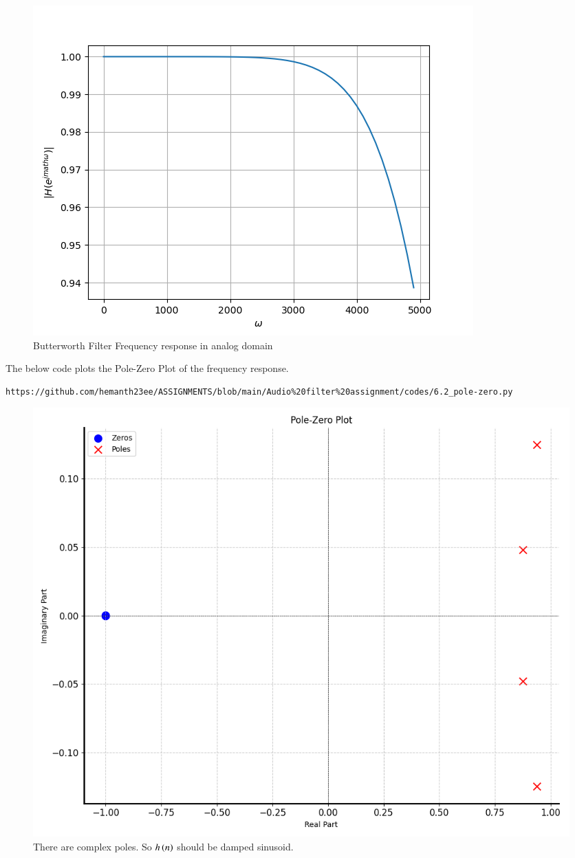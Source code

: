 \documentclass[journal,12pt,twocolumn]{IEEEtran}
\theoremstyle{remark}
\begin{document}
\begin{enumerate}
\begin{figure}[H]
\includegraphics[width=1\columnwidth]{figs/Butterworth_analog.png}
\caption{Butterworth Filter Frequency response in analog domain}
\label{H(w)_6.46.1}
\end{figure}



The below code plots the Pole-Zero Plot of the frequency response.
\begin{lstlisting}
https://github.com/hemanth23ee/ASSIGNMENTS/blob/main/Audio%20filter%20assignment/codes/6.2_pole-zero.py
\end{lstlisting}
\begin{figure}[H]
\centering
\includegraphics[width=1\columnwidth]{figs/Pole_Zero_Plt.png}
\caption{There are complex poles. So $h\left(n\right)$ should be damped sinusoid.}
\label{pole_zero_6.2.46}
\end{figure}


\end{enumerate}
\end{document}
